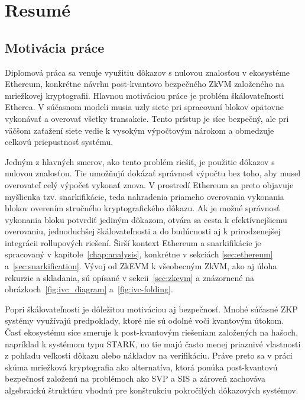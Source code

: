 \thispagestyle{empty}

\chapter*{Resum\'e}

\section{Motivácia práce}

Diplomová práca sa venuje využitiu dôkazov s nulovou znalosťou v ekosystéme
Ethereum, konkrétne návrhu post-kvantovo bezpečného ZkVM založeného na
mriežkovej kryptografii. Hlavnou motiváciou práce je problém škálovateľnosti
Etherea. V súčasnom modeli musia uzly siete pri spracovaní blokov opätovne
vykonávať a overovať všetky transakcie. Tento prístup je síce bezpečný, ale pri
väčšom zaťažení siete vedie k vysokým výpočtovým nárokom a obmedzuje celkovú
priepustnosť systému.

Jedným z hlavných smerov, ako tento problém riešiť, je použitie dôkazov s
nulovou znalosťou. Tie umožňujú dokázať správnosť výpočtu bez toho, aby musel
overovateľ celý výpočet vykonať znova. V prostredí Ethereum sa preto objavuje
myšlienka tzv. snarkifikácie, teda nahradenia priameho overovania vykonania
blokov overením stručného kryptografického dôkazu. Ak je možné správnosť
vykonania bloku potvrdiť jediným dôkazom, otvára sa cesta k efektívnejšiemu
overovaniu, jednoduchšej škálovateľnosti a do budúcnosti aj k prirodzenejšej
integrácii rollupových riešení. Širší kontext Ethereum a snarkifikácie je
spracovaný v kapitole~\ref{chap:analysis}, konkrétne v sekciách
\ref{sec:ethereum} a~\ref{sec:snarkification}. Vývoj od ZkEVM k všeobecným
ZkVM, ako aj úloha rekurzie a skladania, sú opísané v sekcii~\ref{sec:zkevm}
a znázornené na obrázkoch~\ref{fig:ivc_diagram} a~\ref{fig:ivc-folding}.

Popri škálovateľnosti je dôležitou motiváciou aj bezpečnosť. Mnohé súčasné ZKP
systémy využívajú predpoklady, ktoré nie sú odolné voči kvantovým útokom.
Časť ekosystému síce smeruje k post-kvantovým riešeniam založených na hašoch, napríklad k
systémom typu STARK, no tie majú často menej priaznivé vlastnosti z pohľadu
veľkosti dôkazu alebo nákladov na verifikáciu. Práve preto sa v práci skúma
mriežková kryptografia ako alternatíva, ktorá ponúka post-kvantovú bezpečnosť
založenú na problémoch ako SVP a SIS a zároveň zachováva algebraickú štruktúru
vhodnú pre konštrukciu pokročilých dôkazových systémov.

